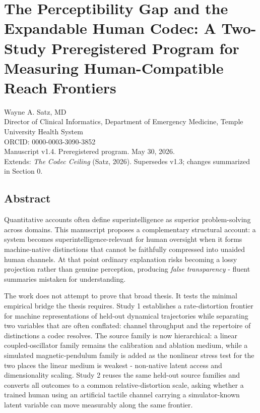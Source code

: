 \documentclass[
  11pt,
]{article}
\author{}
\date{}
\begin{document}
\section{The Perceptibility Gap and the Expandable
Human Codec: A Two-Study Preregistered Program for
Measuring Human-Compatible Reach
Frontiers}\label{the-perceptibility-gap-and-the-expandable-human-codec-a-two-study-preregistered-program-for-measuring-human-compatible-reach-frontiers}

Wayne A. Satz, MD\\
Director of Clinical Informatics, Department of
Emergency Medicine, Temple University Health System\\
ORCID: 0000-0003-3090-3852\\
Manuscript v1.4. Preregistered program. May 30, 2026.\\
Extends: \emph{The Codec Ceiling} (Satz, 2026).
Supersedes v1.3; changes summarized in Section 0.

\subsection{Abstract}\label{abstract}

Quantitative accounts often define superintelligence as
superior problem-solving across domains. This
manuscript proposes a complementary structural account:
a system becomes superintelligence-relevant for human
oversight when it forms machine-native distinctions
that cannot be faithfully compressed into unaided human
channels. At that point ordinary explanation risks
becoming a lossy projection rather than genuine
perception, producing \emph{false transparency} -
fluent summaries mistaken for understanding.

The work does not attempt to prove that broad thesis.
It tests the minimal empirical bridge the thesis
requires. Study 1 establishes a rate-distortion
frontier for machine representations of held-out
dynamical trajectories while separating two variables
that are often conflated: channel throughput and the
repertoire of distinctions a codec resolves. The source
family is now hierarchical: a linear coupled-oscillator
family remains the calibration and ablation medium,
while a simulated magnetic-pendulum family is added as
the nonlinear stress test for the two places the linear
medium is weakest - non-native latent access and
dimensionality scaling. Study 2 reuses the same
held-out source families and converts all outcomes to a
common relative-distortion scale, asking whether a
trained human using an artificial tactile channel
carrying a simulator-known latent variable can move
measurably along the same frontier.
\end{document}
